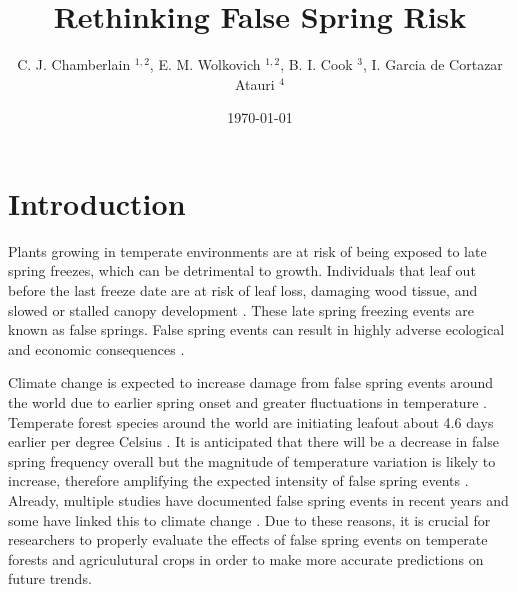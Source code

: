 \documentclass{article}\usepackage[]{graphicx}\usepackage[]{color}
\begin{document}
\title{Rethinking False Spring Risk}
\author{C. J. Chamberlain $^{1,2}$, E. M. Wolkovich $^{1,2}$, B. I. Cook $^{3}$, I. Garcia de Cortazar Atauri $^{4}$}
\date{\today}
\maketitle 
 

\renewcommand{\thetable}{\arabic{table}}
\renewcommand{\thefigure}{\arabic{figure}}
\renewcommand{\labelitemi}{$-$}

\section*{Introduction}
Plants growing in temperate environments are at risk of being exposed to late spring freezes, which can be detrimental to growth. Individuals that leaf out before the last freeze date are at risk of leaf loss, damaging wood tissue, and slowed or stalled canopy development \citep{Gu2008, Hufkens2012}. These late spring freezing events are known as false springs. False spring events can result in highly adverse ecological and economic consequences \citep{Knudson2012, Ault2013}. 

Climate change is expected to increase damage from false spring events around the world due to earlier spring onset and greater fluctuations in temperature \citep{Cannell1986, Inouye2008, Martin2010}. Temperate forest species around the world are initiating leafout about 4.6 days earlier per degree Celsius \citep{Wolkovich2012, Polgar2014}. It is anticipated that there will be a decrease in false spring frequency overall but the magnitude of temperature variation is likely to increase, therefore amplifying the expected intensity of false spring events \citep{Kodra2011, Allstadt2015}. Already, multiple studies have documented false spring events in recent years \citep{Gu2008, Augspurger2009, Knudson2012, Augspurger2013} and some have linked this to climate change \citep{Ault2013, Allstadt2015, Muffler2016, Xin2016}. Due to these reasons, it is crucial for researchers to properly evaluate the effects of false spring events on temperate forests and agriculutural crops in order to make more accurate predictions on future trends.
\end{document}
